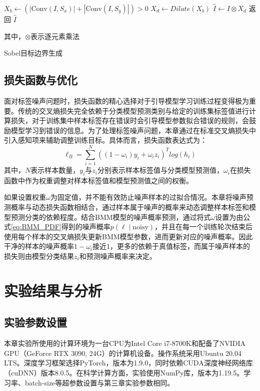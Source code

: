 \begin{algorithm}[H]
  $ X_b\gets \left( \left| \text{Conv}\left( I,S_x \right) \right|+\left| \text{Conv}\left( I,S_y \right) \right| \right) >0 $ \;
  $X_d\gets Dilate(X_b)$ \;
  $\hat{I}\gets I\otimes X_d$ \;
  返回 $\hat{I}$ \;

  其中，$\otimes$表示逐元素乘法
  \caption{Sobel目标边界生成}
  \label{Sobel}
\end{algorithm}


\subsection{损失函数与优化}
面对标签噪声问题时，损失函数的精心选择对于引导模型学习训练过程变得极为重要。传统的交叉熵损失完全依赖于分类模型预测类别与给定的训练集标签值进行计算损失，对于训练集中样本标签存在错误时会引导模型参数拟合错误的规则，会鼓励模型学习到错误的信息。为了处理标签噪声问题，本章通过在标准交叉熵损失中引入感知项来辅助调整训练目标。具体而言，损失函数表达式为：
\begin{equation}
  \ell_B=\sum_{i=1}^{N}((1-\omega_i)y_i+\omega_iz_i)^Tlog(h_i)
\end{equation}
其中，$N$表示样本数量，$y_i$与$z_i$分别表示样本标签值与分类模型预测值，$\omega_i$在损失函数中作为权重调整对样本标签值和模型预测值之间的权衡。

如果设置权重$\omega$为固定值，并不能有效防止噪声样本的过拟合情况。本章将噪声预测概率与动态损失函数相结合，通过样本属于噪声的概率来动态调整样本标签和模型预测分类的依赖程度。结合BMM模型的噪声概率预测，通过将式$\omega$设置为由公式\ref{eq:BMM_PDF}得到的噪声概率$p(\ell \mid \text{noisy})$，并且在每一个训练轮次结束后使用每个样本的交叉熵损失更新BMM模型参数，进而更新对应的噪声概率。因此干净的样本的噪声概率$1-\omega_i$接近1，更多的依赖于真值标签，而属于噪声样本的损失则由模型分类结果$z_i$和预测噪声概率来决定。

\section{实验结果与分析}
\subsection{实验参数设置}
本章实验所使用的计算环境为一台CPU为Intel Core i7-8700K和配备了NVIDIA GPU（GeForce RTX 3090, 24G）的计算机设备。操作系统采用Ubuntu 20.04 LTS。深度学习框架选择PyTorch，版本为1.9.0，同时依赖CUDA深度神经网络库（cuDNN）版本8.0.5。在科学计算方面，实验使用NumPy库，版本为1.19.5。学习率、batch-size等超参数设置与第三章实验参数相同。

